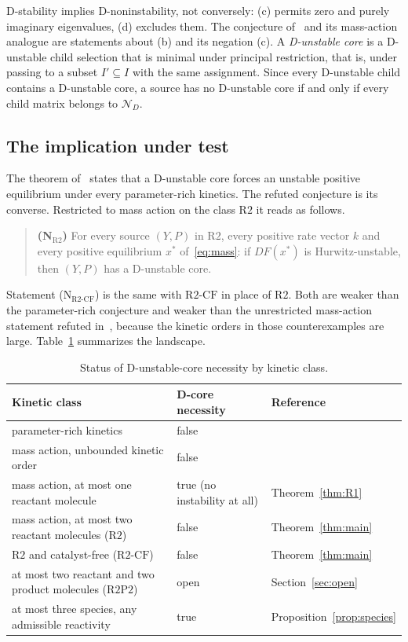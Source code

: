 \documentclass[11pt,a4paper]{article}
\theoremstyle{plain}
\theoremstyle{definition}
\theoremstyle{remark}
\newcommand{\DN}{\mathcal{N}_D}
\newcommand{\xs}{x^{*}}
\newcommand{\Ract}{\mathrm{R2}}
\newcommand{\Rcf}{\mathrm{R2\text{-}CF}}
\newcommand{\Rpp}{\mathrm{R2P2}}
\begin{document}
D-stability implies D-noninstability, not conversely: (c) permits zero and purely imaginary eigenvalues, (d) excludes them. The conjecture of~\cite{VassenaStadler2024} and its mass-action analogue are statements about (b) and its negation (c). A \emph{D-unstable core} is a D-unstable child selection that is minimal under principal restriction, that is, under passing to a subset $I'\subseteq I$ with the same assignment. Since every D-unstable child contains a D-unstable core, a source has no D-unstable core if and only if every child matrix belongs to $\DN$.

\subsection{The implication under test}

The theorem of~\cite{VassenaStadler2024} states that a D-unstable core forces an unstable positive equilibrium under every parameter-rich kinetics. The refuted conjecture is its converse. Restricted to mass action on the class $\Ract$ it reads as follows.

\begin{quote}
\textbf{(N$_{\Ract}$)} For every source $(Y,P)$ in $\Ract$, every positive rate vector $k$ and every positive equilibrium $\xs$ of~\eqref{eq:mass}: if $DF(\xs)$ is Hurwitz-unstable, then $(Y,P)$ has a D-unstable core.
\end{quote}

Statement (N$_{\Rcf}$) is the same with $\Rcf$ in place of $\Ract$. Both are weaker than the parameter-rich conjecture and weaker than the unrestricted mass-action statement refuted in~\cite{KineticOrder2026}, because the kinetic orders in those counterexamples are large. Table~\ref{tab:classes} summarizes the landscape.

\begin{table}[ht]
\centering\footnotesize
\begin{tabular}{@{}lll@{}}
\toprule
Kinetic class & D-core necessity & Reference\\
\midrule
parameter-rich kinetics & false & \cite{ParameterRich2026}\\
mass action, unbounded kinetic order & false & \cite{KineticOrder2026}\\
mass action, at most one reactant molecule & true (no instability at all) & Theorem~\ref{thm:R1}\\
mass action, at most two reactant molecules ($\Ract$) & false & Theorem~\ref{thm:main}\\
$\Ract$ and catalyst-free ($\Rcf$) & false & Theorem~\ref{thm:main}\\
at most two reactant and two product molecules ($\Rpp$) & open & Section~\ref{sec:open}\\
at most three species, any admissible reactivity & true & Proposition~\ref{prop:species}\\
\bottomrule
\end{tabular}
\caption{Status of D-unstable-core necessity by kinetic class.}
\label{tab:classes}
\end{table}
\end{document}
